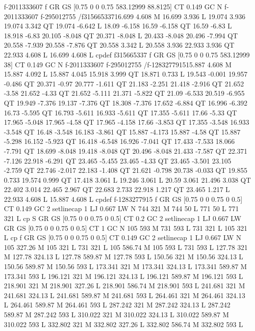 f-2011333607
f
GR
GS
[0.75 0 0 0.75 583.12999 88.8125] CT
0.149 GC
N
f-2011333607
f-295012755
/f315665337{16.699 4.608 M
16.699 3.936 L
19.074 3.936 19.074 3.342 QT
19.074 -6.642 L
18.09 -6.158 16.59 -6.158 QT
16.59 -6.83 L
18.918 -6.83 20.105 -8.048 QT
20.371 -8.048 L
20.433 -8.048 20.496 -7.994 QT
20.558 -7.939 20.558 -7.876 QT
20.558 3.342 L
20.558 3.936 22.933 3.936 QT
22.933 4.608 L
16.699 4.608 L
cp}def
f315665337
f
GR
GS
[0.75 0 0 0.75 583.12999 38] CT
0.149 GC
N
f-2011333607
f-295012755
/f-1283277915{15.887 4.608 M
15.887 4.092 L
15.887 4.045 15.918 3.999 QT
18.871 0.733 L
19.543 -0.001 19.957 -0.486 QT
20.371 -0.97 20.777 -1.611 QT
21.183 -2.251 21.418 -2.916 QT
21.652 -3.58 21.652 -4.33 QT
21.652 -5.111 21.371 -5.822 QT
21.09 -6.533 20.519 -6.955 QT
19.949 -7.376 19.137 -7.376 QT
18.308 -7.376 17.652 -6.884 QT
16.996 -6.392 16.73 -5.595 QT
16.793 -5.611 16.933 -5.611 QT
17.355 -5.611 17.66 -5.33 QT
17.965 -5.048 17.965 -4.58 QT
17.965 -4.158 17.66 -3.853 QT
17.355 -3.548 16.933 -3.548 QT
16.48 -3.548 16.183 -3.861 QT
15.887 -4.173 15.887 -4.58 QT
15.887 -5.298 16.152 -5.923 QT
16.418 -6.548 16.926 -7.041 QT
17.433 -7.533 18.066 -7.791 QT
18.699 -8.048 19.418 -8.048 QT
20.496 -8.048 21.433 -7.587 QT
22.371 -7.126 22.918 -6.291 QT
23.465 -5.455 23.465 -4.33 QT
23.465 -3.501 23.105 -2.759 QT
22.746 -2.017 22.183 -1.408 QT
21.621 -0.798 20.738 -0.033 QT
19.855 0.733 19.574 0.999 QT
17.418 3.061 L
19.246 3.061 L
20.59 3.061 21.496 3.038 QT
22.402 3.014 22.465 2.967 QT
22.683 2.733 22.918 1.217 QT
23.465 1.217 L
22.933 4.608 L
15.887 4.608 L
cp}def
f-1283277915
f
GR
GS
[0.75 0 0 0.75 0 0.5] CT
0.149 GC
2 setlinecap
1 LJ
0.667 LW
N
744 321 M
744 50 L
771 50 L
771 321 L
cp
S
GR
GS
[0.75 0 0 0.75 0 0.5] CT
0.2 GC
2 setlinecap
1 LJ
0.667 LW
GR
GS
[0.75 0 0 0.75 0 0.5] CT
1 GC
N
105 593 M
731 593 L
731 321 L
105 321 L
cp
f
GR
GS
[0.75 0 0 0.75 0 0.5] CT
0.149 GC
2 setlinecap
1 LJ
0.667 LW
N
105 327.26 M
105 321 L
731 321 L
105 586.74 M
105 593 L
731 593 L
127.78 321 M
127.78 324.13 L
127.78 589.87 M
127.78 593 L
150.56 321 M
150.56 324.13 L
150.56 589.87 M
150.56 593 L
173.341 321 M
173.341 324.13 L
173.341 589.87 M
173.341 593 L
196.121 321 M
196.121 324.13 L
196.121 589.87 M
196.121 593 L
218.901 321 M
218.901 327.26 L
218.901 586.74 M
218.901 593 L
241.681 321 M
241.681 324.13 L
241.681 589.87 M
241.681 593 L
264.461 321 M
264.461 324.13 L
264.461 589.87 M
264.461 593 L
287.242 321 M
287.242 324.13 L
287.242 589.87 M
287.242 593 L
310.022 321 M
310.022 324.13 L
310.022 589.87 M
310.022 593 L
332.802 321 M
332.802 327.26 L
332.802 586.74 M
332.802 593 L
